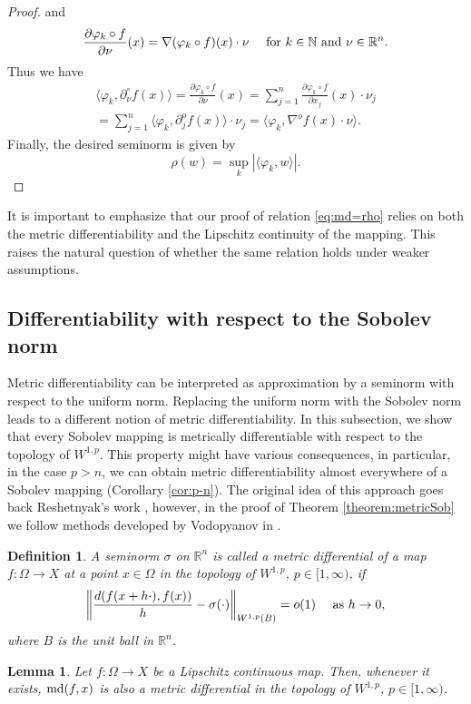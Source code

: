 \documentclass[reqno]{amsart}
\newtheorem{lem}[thm]{Lemma}
\newtheorem{defn}[thm]{Definition}
\begin{document}
\begin{proof}
and
\[
\frac{\partial \varphi_{k}\circ f}{\partial\nu}(x) = \nabla (\varphi_{k}\circ f)(x) \cdot \nu
\quad \textnormal{ for } k\in \mathbb N \textnormal{ and } \nu \in \mathbb R^n.
\] 
Thus we have
\begin{align}
\langle \varphi_k, \partial^\circ_\nu f(x) \rangle
= \frac{\partial \varphi_{k}\circ f}{\partial\nu}(x) 
= \sum_{j=1}^n \frac{\partial \varphi_{k}\circ f}{\partial x_j}(x) \cdot\nu_j \\
 = \sum_{j=1}^n \langle \varphi_k, \partial^o_jf(x) \rangle \cdot\nu_j 
  = \langle \varphi_k, \nabla^of(x)\cdot\nu \rangle.
\end{align}
Finally, the desired seminorm is given by
\[
\rho(w) = \sup_k|  \langle \varphi_k, w \rangle|.
\]
\end{proof}
It is important to emphasize that our proof of relation  \eqref{eq:md=rho} relies on both the metric differentiability and the Lipschitz continuity of the mapping. 
This raises the natural question of whether the same relation holds under weaker assumptions.

\subsection{Differentiability with respect to the Sobolev norm}
Metric differentiability can be interpreted as approximation by a seminorm with respect to the uniform norm. Replacing the uniform norm with the Sobolev norm leads to a different notion of metric differentiability. In this subsection, we show that every Sobolev mapping is metrically differentiable with respect to the topology of $W^{1,p}$.
This property might have various consequences, in particular, in the case $p>n$, we can obtain metric differentiability almost everywhere of a Sobolev mapping (Corollary \ref{cor:p-n}). 
The original idea of this approach goes back Reshetnyak's work \cite{R1969}, however, in the proof of Theorem \ref{theorem:metricSob} we follow methods developed by Vodopyanov in \cite{V:2003}.

\begin{defn}
A seminorm $\sigma$ on $\mathbb R^n$ is called a metric differential of a map $f:\Omega\to X$
at a point $x\in\Omega$ in the topology of $W^{1,p}$, $p\in[1,\infty)$, if
\[
\bigg\| \frac{d(f(x+h\cdot), f(x))}{h} - \sigma(\cdot) \bigg\|_{W^{1,p}(B)} = o(1) 
\quad \textnormal{ as } h\to 0,
\]
where $B$ is the unit ball in $\mathbb R^n$.
\end{defn}

\begin{lem}\label{lemma:LipDiff}
Let $f:\Omega\to X$ be a Lipschitz continuous map.
Then, whenever it exists, $\textnormal{md}(f, x)$ is also a metric differential in the topology of $W^{1,p}$, $p\in[1,\infty)$.
\end{lem}
\end{document}
